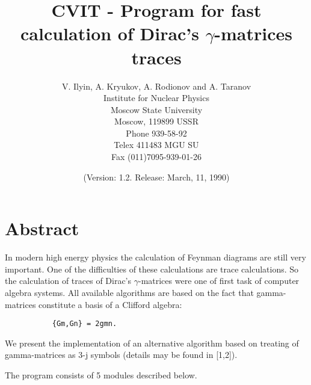 \title{CVIT - Program for fast calculation of Dirac's $\gamma$-matrices
traces}
\date{(Version: 1.2. Release: March, 11, 1990)}
\author{V. Ilyin, A. Kryukov, A. Rodionov and A. Taranov \\
Institute for Nuclear Physics \\
Moscow State University  \\
Moscow, 119899 USSR  \\
Phone 939-58-92  \\
Telex 411483 MGU SU  \\
Fax (011)7095-939-01-26}


\maketitle
\section*{Abstract}

In modern high energy physics the calculation of Feynman diagrams are
still very important. One of the difficulties of these calculations
are trace calculations. So the calculation of traces of Dirac's
$\gamma$-matrices were one of first task of computer algebra systems.
All available algorithms are based on the fact that gamma-matrices
constitute a basis of a Clifford algebra:
\begin{verbatim}
           {Gm,Gn} = 2gmn.
\end{verbatim}

We present the implementation of an alternative algorithm based on
treating of gamma-matrices as 3-j symbols (details may be found in
[1,2]).

The program consists of 5 modules described below.

